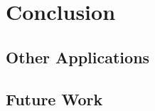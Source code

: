 
\chapter{Conclusion}\label{chapter:conclusion}

\section{Other Applications}

\section{Future Work}
